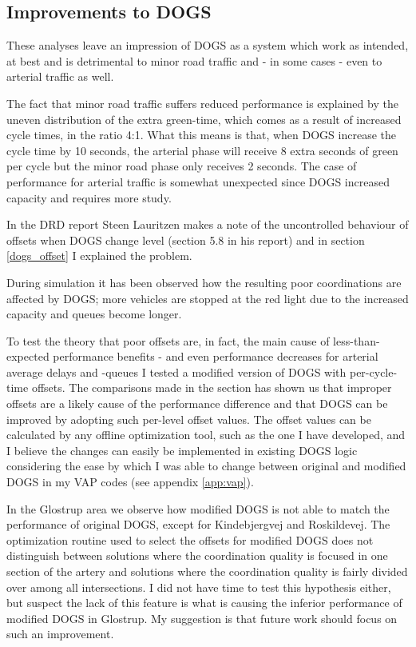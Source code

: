 \subsection*{Improvements to DOGS}
These analyses leave an impression of DOGS as a system which work as intended, at best and is detrimental to minor road traffic and - in some cases - even to arterial traffic as well.

The fact that minor road traffic suffers reduced performance is explained by the uneven distribution of the extra green-time, which comes as a result of increased cycle times, in the ratio 4:1. What this means is that, when DOGS increase the cycle time by 10 seconds, the arterial phase will receive 8 extra seconds of green per cycle but the minor road phase only receives 2 seconds. 
The case of performance for arterial traffic is somewhat unexpected since DOGS increased capacity and requires more study.

In the DRD report \cite{dogs} Steen Lauritzen makes a note of the uncontrolled behaviour of offsets when DOGS change level (section 5.8 in his report) and in section \ref{dogs_offset} I explained the problem.

During simulation it has been observed how the resulting poor coordinations are affected by DOGS; more vehicles are stopped at the red light due to the increased capacity and queues become longer. 

To test the theory that poor offsets are, in fact, the main cause of less-than-expected performance benefits - and even performance decreases for arterial average delays and -queues I tested a modified version of DOGS with per-cycle-time offsets. The comparisons made in the section has shown us that improper offsets are a likely cause of the performance difference and that DOGS can be improved by adopting such per-level offset values. The offset values can be calculated by any offline optimization tool, such as the one I have developed, and I believe the changes can easily be implemented in existing DOGS logic considering the ease by which I was able to change between original and modified DOGS in my VAP codes (see appendix \ref{app:vap}).

In the Glostrup area we observe how modified DOGS is not able to match the performance of original DOGS, except for Kindebjergvej and Roskildevej. The optimization routine used to select the offsets for modified DOGS does not distinguish between solutions where the coordination quality is focused in one section of the artery and solutions where the coordination quality is fairly divided over among all intersections. I did not have time to test this hypothesis either, but suspect the lack of this feature is what is causing the inferior performance of modified DOGS in Glostrup. My suggestion is that future work should focus on such an improvement.

